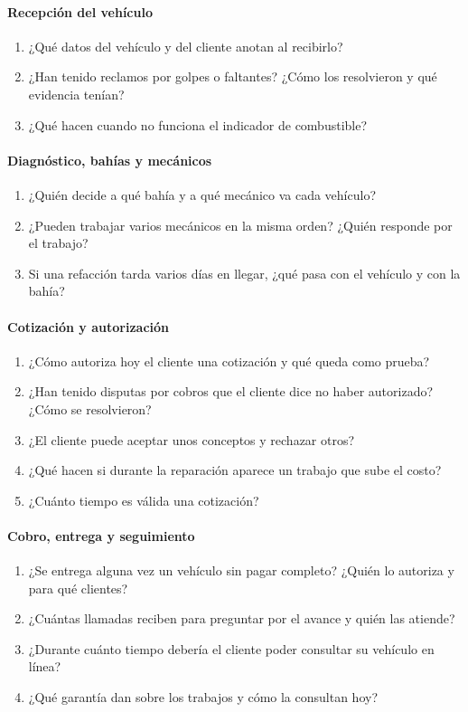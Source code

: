 \paragraph{Recepción del vehículo}
\begin{enumerate}
\tightlist
\setcounter{enumi}{6}
\item ¿Qué datos del vehículo y del cliente anotan al recibirlo?
\item ¿Han tenido reclamos por golpes o faltantes? ¿Cómo los resolvieron
y qué evidencia tenían?
\item ¿Qué hacen cuando no funciona el indicador de combustible?
\end{enumerate}

\paragraph{Diagnóstico, bahías y mecánicos}
\begin{enumerate}
\tightlist
\setcounter{enumi}{9}
\item ¿Quién decide a qué bahía y a qué mecánico va cada vehículo?
\item ¿Pueden trabajar varios mecánicos en la misma orden? ¿Quién
responde por el trabajo?
\item Si una refacción tarda varios días en llegar, ¿qué pasa con el
vehículo y con la bahía?
\end{enumerate}

\paragraph{Cotización y autorización}
\begin{enumerate}
\tightlist
\setcounter{enumi}{12}
\item ¿Cómo autoriza hoy el cliente una cotización y qué queda como
prueba?
\item ¿Han tenido disputas por cobros que el cliente dice no haber
autorizado? ¿Cómo se resolvieron?
\item ¿El cliente puede aceptar unos conceptos y rechazar otros?
\item ¿Qué hacen si durante la reparación aparece un trabajo que sube el
costo?
\item ¿Cuánto tiempo es válida una cotización?
\end{enumerate}

\paragraph{Cobro, entrega y seguimiento}
\begin{enumerate}
\tightlist
\setcounter{enumi}{17}
\item ¿Se entrega alguna vez un vehículo sin pagar completo? ¿Quién lo
autoriza y para qué clientes?
\item ¿Cuántas llamadas reciben para preguntar por el avance y quién las
atiende?
\item ¿Durante cuánto tiempo debería el cliente poder consultar su
vehículo en línea?
\item ¿Qué garantía dan sobre los trabajos y cómo la consultan hoy?
\end{enumerate}

